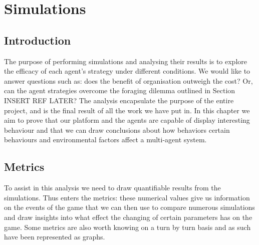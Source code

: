\chapter{Simulations}
\section{Introduction}
\label{sec:Simulations:Intro}

The purpose of performing simulations and analysing their results is to explore the efficacy of each agent's strategy under different conditions. We would like to answer questions such as: does the benefit of organisation outweigh the cost? Or, can the agent strategies overcome the foraging dilemma outlined in Section INSERT REF LATER? The analysis encapsulate the purpose of the entire project, and is the final result of all the work we have put in. In this chapter we aim to prove that our platform and the agents are capable of display interesting behaviour and that we can draw conclusions about how behaviors certain behaviours and environmental factors affect a multi-agent system.

\section{Metrics}
\label{sec:Simulations:Metric}

To assist in this analysis we need to draw quantifiable results from the simulations. Thus enters the metrics: these numerical values give us information on the events of the game that we can then use to compare numerous simulations and draw insights into what effect the changing of certain parameters has on the game. Some metrics are also worth knowing on a turn by turn basis and as such have been represented as graphs. 


